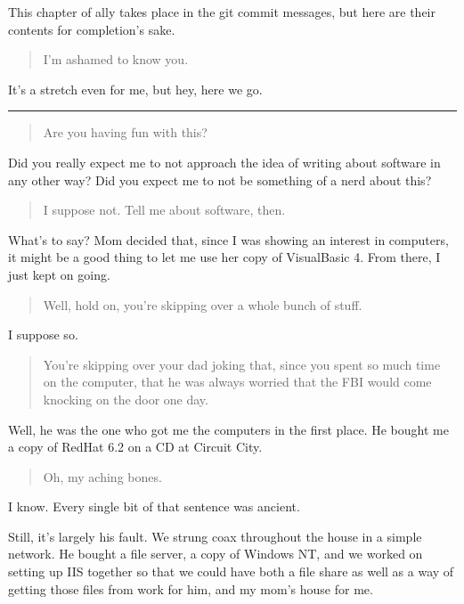 This chapter of ally takes place in the git commit messages, but here are their contents for completion's sake.

\begin{quote}
I'm ashamed to know you.
\end{quote}

It's a stretch even for me, but hey, here we go.

\begin{center}\rule{0.5\linewidth}{\linethickness}\end{center}

\begin{quote}
Are you having fun with this?
\end{quote}

Did you really expect me to not approach the idea of writing about software in any other way? Did you expect me to not be something of a nerd about this?

\begin{quote}
I suppose not. Tell me about software, then.
\end{quote}

What's to say? Mom decided that, since I was showing an interest in computers, it might be a good thing to let me use her copy of VisualBasic 4. From there, I just kept on going.

\begin{quote}
Well, hold on, you're skipping over a whole bunch of stuff.
\end{quote}

I suppose so.

\begin{quote}
You're skipping over your dad joking that, since you spent so much time on the computer, that he was always worried that the FBI would come knocking on the door one day.
\end{quote}

Well, he was the one who got me the computers in the first place. He bought me a copy of RedHat 6.2 on a CD at Circuit City.

\begin{quote}
Oh, my aching bones.
\end{quote}

I know. Every single bit of that sentence was ancient.

Still, it's largely his fault. We strung coax throughout the house in a simple network. He bought a file server, a copy of Windows NT, and we worked on setting up IIS together so that we could have both a file share as well as a way of getting those files from work for him, and my mom's house for me.

